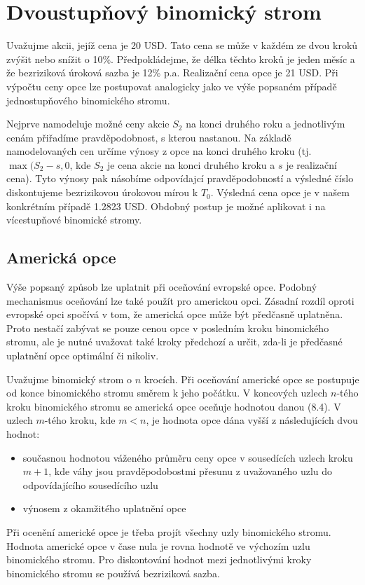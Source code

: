 \documentclass[a4paper]{book}
\begin{document}
\section{Dvoustupňový binomický strom}

Uvažujme akcii, jejíž cena je 20 USD. Tato cena se může v každém ze dvou kroků zvýšit nebo snížit o 10\%. Předpokládejme, že délka těchto kroků je jeden měsíc a že bezriziková úroková sazba je 12\% p.a. Realizační cena opce je 21 USD. Při výpočtu ceny opce lze postupovat analogicky jako ve výše popsaném případě jednostupňového binomického stromu.

Nejprve namodeluje možné ceny akcie $S_2$ na konci druhého roku a jednotlivým cenám přiřadíme pravděpodobnost, s kterou nastanou. Na základě namodelovaných cen určíme výnosy z opce na konci druhého kroku (tj. $\max(S_2 - s,0$, kde $S_2$ je cena akcie na konci druhého kroku a $s$ je realizační cena). Tyto výnosy pak násobíme odpovídajcí pravděpodobností a výsledné číslo diskontujeme bezrizikovou úrokovou mírou k $T_0$. Výsledná cena opce je v našem konkrétním případě 1.2823 USD. Obdobný postup je možné aplikovat i na vícestupňové binomické stromy.\\

\subsection{Americká opce}

Výše popsaný způsob lze uplatnit při oceňování evropské opce. Podobný mechanismus oceňování lze také použít pro americkou opci. Zásadní rozdíl oproti evropské opci spočívá v tom, že americká opce může být předčasně uplatněna. Proto nestačí zabývat se pouze cenou opce v posledním kroku binomického stromu, ale je nutné uvažovat také kroky předchozí a určit, zda-li je předčasné uplatnění opce optimální či nikoliv.

Uvažujme binomický strom o $n$ krocích. Při oceňování americké opce se postupuje od konce binomického stromu směrem k jeho počátku. V koncových uzlech $n$-tého kroku binomického stromu se americká opce oceňuje hodnotou danou (8.4). V uzlech $m$-tého kroku, kde $m < n$, je hodnota opce dána vyšší z následujících dvou hodnot:
\begin{itemize}
\item současnou hodnotou váženého průměru ceny opce v sousedících uzlech kroku $m+1$, kde váhy jsou pravděpodobostmi přesunu z uvažovaného uzlu do odpovídajícího sousedícího uzlu
\item výnosem z okamžitého uplatnění opce
\end{itemize}
Při ocenění americké opce je třeba projít všechny uzly binomického stromu. Hodnota americké opce v čase nula je rovna hodnotě ve výchozím uzlu binomického stromu. Pro diskontování hodnot mezi jednotlivými kroky binomického stromu se používá bezriziková sazba.
\end{document}
